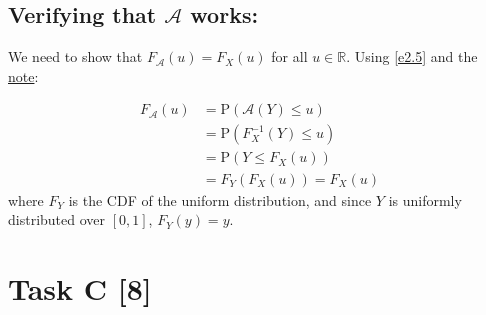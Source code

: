 \subsection*{Verifying that $\mathcal{A}$ works:}

We need to show that $F_\mathcal{A}(u) = F_X(u)$ for all $u \in \mathbb{R}$. Using
\ref{e2.5} and the \hyperlink{3bNote}{note}:

\begin{equation*}
    \begin{aligned}
        F_\mathcal{A}(u) &= \text{P}(\mathcal{A}(Y) \leq u) \\
        &= \text{P}(F_X^{-1}(Y) \leq u) \\
        &= \text{P}(Y \leq F_X(u)) \\
        &= F_Y(F_X(u)) = F_X(u)
    \end{aligned}
\end{equation*}
where $F_Y$ is the CDF of the uniform distribution, and since $Y$ is uniformly
distributed over $[0,1]$, $F_Y(y) = y$.

\section*{\colS{$\S$} Task C \hfill \normalfont \large [8]}

